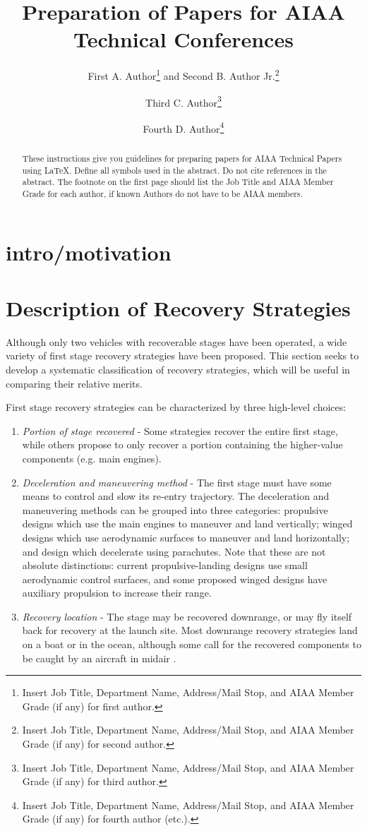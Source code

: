 \documentclass[conf]{new-aiaa}
\title{Preparation of Papers for AIAA Technical Conferences}
\author{First A. Author\footnote{Insert Job Title, Department Name, Address/Mail Stop, and AIAA Member Grade (if any) for first author.} and Second B. Author Jr.\footnote{Insert Job Title, Department Name, Address/Mail Stop, and AIAA Member Grade (if any) for second author.}}
\affil{Business or Academic Affiliation 1, City, State, Zip Code}
\author{Third C. Author\footnote{Insert Job Title, Department Name, Address/Mail Stop, and AIAA Member Grade (if any) for third author.}}
\affil{Business or Academic Affiliation 2, City, Province, Zip Code, Country}
\author{Fourth D. Author\footnote{Insert Job Title, Department Name, Address/Mail Stop, and AIAA Member Grade (if any) for fourth author (etc.).}}
\affil{Business or Academic Affiliation 2, City, State, Zip Code}
\begin{document}
\maketitle

\begin{abstract}
These instructions give you guidelines for preparing papers for AIAA Technical Papers using \LaTeX{}. Define all symbols used in the abstract. Do not cite references in the abstract. The footnote on the first page should list the Job Title and AIAA Member Grade for each author, if known Authors do not have to be AIAA members.
\end{abstract}

\section{intro/motivation}

\section{Description of Recovery Strategies}
Although only two vehicles with recoverable stages have been operated, a wide variety of first stage recovery strategies have been proposed. This section seeks to develop a systematic classification of recovery strategies, which will be useful in comparing their relative merits.

First stage recovery strategies can be characterized by three high-level choices:
\begin{enumerate}
	\item \textit{Portion of stage recovered} - Some strategies recover the entire first stage, while others propose to only recover a portion containing the higher-value components (e.g. main engines).
	\item \textit{Deceleration and maneuvering method} - The first stage must have some means to control and slow its re-entry trajectory. The deceleration and maneuvering methods can be grouped into three categories: propulsive designs which use the main engines to maneuver and land vertically; winged designs which use aerodynamic surfaces to maneuver and land horizontally; and design which decelerate using parachutes. Note that these are not absolute distinctions: current propulsive-landing designs use small aerodynamic control surfaces, and some proposed winged designs have auxiliary propulsion to increase their range.
	\item \textit{Recovery location} - The stage may be recovered downrange, or may fly itself back for recovery at the launch site. Most downrange recovery strategies land on a boat or in the ocean, although some call for the recovered components to be caught by an aircraft in midair \cite{Ragab2015}.
\end{enumerate}
\end{document}
